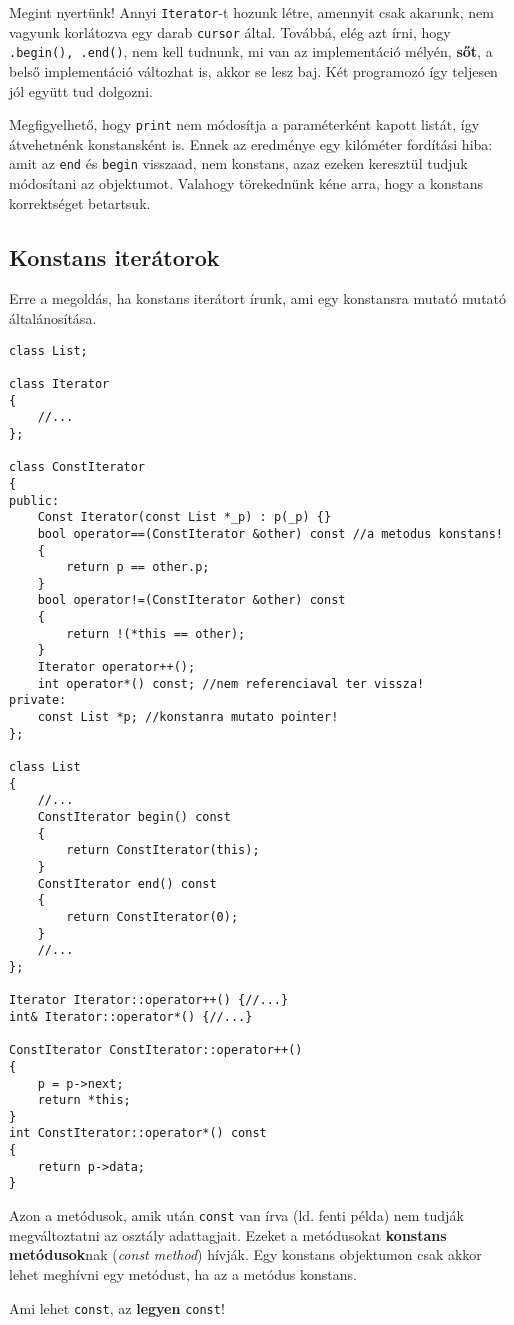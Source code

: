 \documentclass[a4paper,11.5pt,table]{article}
\begin{document}
	\medskip
	Megint nyertünk! Annyi \texttt{Iterator}-t hozunk létre, amennyit csak akarunk, nem vagyunk korlátozva egy darab \texttt{cursor} által. Továbbá, elég azt írni, hogy \texttt{.begin(), .end()}, nem kell tudnunk, mi van az implementáció mélyén, \textbf{sőt}, a belső implementáció változhat is, akkor se lesz baj. Két programozó így teljesen jól együtt tud dolgozni.
	
	\medskip
	Megfigyelhető, hogy \texttt{print} nem módosítja a paraméterként kapott listát, így átvehetnénk konstansként is. Ennek az eredménye egy kilóméter fordítási hiba: amit az \texttt{end} és \texttt{begin} visszaad, nem konstans, azaz ezeken keresztül tudjuk módosítani az objektumot. Valahogy törekednünk kéne arra, hogy a konstans korrektséget betartsuk.
	\subsection{Konstans iterátorok}
	Erre a megoldás, ha konstans iterátort írunk, ami egy konstansra mutató mutató általánosítása.
\begin{lstlisting}
class List;

class Iterator
{
	//...
};

class ConstIterator
{
public:
	Const Iterator(const List *_p) : p(_p) {}
	bool operator==(ConstIterator &other) const //a metodus konstans!
	{
		return p == other.p;
	}
	bool operator!=(ConstIterator &other) const
	{
		return !(*this == other);
	}
	Iterator operator++();
	int operator*() const; //nem referenciaval ter vissza!
private:
	const List *p; //konstanra mutato pointer!
};

class List
{
	//...
	ConstIterator begin() const
	{
		return ConstIterator(this);	
	}
	ConstIterator end() const
	{
		return ConstIterator(0);	
	}
	//...
};

Iterator Iterator::operator++() {//...}
int& Iterator::operator*() {//...}

ConstIterator ConstIterator::operator++()
{
	p = p->next;
	return *this;
}
int ConstIterator::operator*() const
{
	return p->data;
}
\end{lstlisting}
	Azon a metódusok, amik után \texttt{const} van írva (ld. fenti példa) nem tudják megváltoztatni az osztály adattagjait. Ezeket a metódusokat \textbf{konstans metódusok}nak (\textit{const method}) hívják. Egy konstans objektumon csak akkor lehet meghívni egy metódust, ha az a metódus konstans.
	\begin{note}
		Ami lehet \texttt{const}, az \textbf{legyen} \texttt{const}!
	\end{note}
\end{document}
